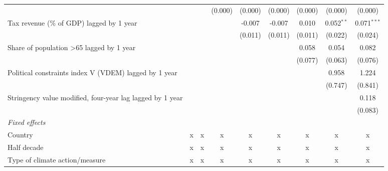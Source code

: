 \begin{tabular}{lcccccccc}
                                                                       &               &               & (0.000)       & (0.000)       & (0.000)       & (0.000) & (0.000)      & (0.000)\\   
   Tax revenue (\% of GDP) lagged by 1 year                            &               &               &               & -0.007        & -0.007        & 0.010   & 0.052$^{**}$ & 0.071$^{***}$\\   
                                                                       &               &               &               & (0.011)       & (0.011)       & (0.011) & (0.022)      & (0.024)\\   
   Share of population >65 lagged by 1 year                            &               &               &               &               &               & 0.058   & 0.054        & 0.082\\   
                                                                       &               &               &               &               &               & (0.077) & (0.063)      & (0.076)\\   
   Political constraints index V (VDEM) lagged by 1 year               &               &               &               &               &               &         & 0.958        & 1.224\\   
                                                                       &               &               &               &               &               &         & (0.747)      & (0.841)\\   
   Stringency value modified, four-year lag lagged by 1 year           &               &               &               &               &               &         &              & 0.118\\   
                                                                       &               &               &               &               &               &         &              & (0.083)\\   
   \emph{Fixed effects}\\
   Country                                                             & x             & x             & x             & x             & x             & x       & x            & x\\  
   Half decade                                                         & x             & x             & x             & x             & x             & x       & x            & x\\  
   Type of climate action/measure                                      & x             & x             & x             & x             & x             & x       & x            & x\\  

\end{tabular}
